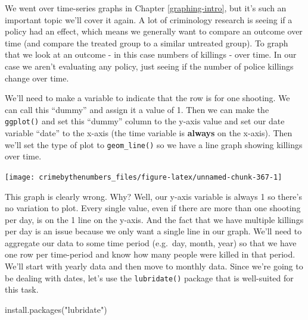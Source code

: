 \documentclass[
  a4paper,
]{krantz}
\makeatletter
\newenvironment{Shaded}{\begin{snugshade}}{\end{snugshade}}
\newcommand{\AttributeTok}[1]{\textcolor[rgb]{0.61,0.61,0.61}{#1}}
\newcommand{\DecValTok}[1]{\textcolor[rgb]{0.06,0.06,0.06}{#1}}
\newcommand{\FunctionTok}[1]{\textcolor[rgb]{0,0,0}{#1}}
\newcommand{\NormalTok}[1]{#1}
\newcommand{\OtherTok}[1]{\textcolor[rgb]{0.37,0.37,0.37}{#1}}
\newcommand{\SpecialCharTok}[1]{\textcolor[rgb]{0,0,0}{#1}}
\newcommand{\StringTok}[1]{\textcolor[rgb]{0.5,0.5,0.5}{#1}}
\newenvironment{kframe}{%
\medskip{}
\setlength{\fboxsep}{.8em}
 \def\at@end@of@kframe{}%
 \ifinner\ifhmode%
  \def\at@end@of@kframe{\end{minipage}}%
  \begin{minipage}{\columnwidth}%
 \fi\fi%
 \def\FrameCommand##1{\hskip\@totalleftmargin \hskip-\fboxsep
 \colorbox{shadecolor}{##1}\hskip-\fboxsep
     \hskip-\linewidth \hskip-\@totalleftmargin \hskip\columnwidth}%
 \MakeFramed {\advance\hsize-\width
   \@totalleftmargin\z@ \linewidth\hsize
   \@setminipage}}%
 {\par\unskip\endMakeFramed%
 \at@end@of@kframe}
\renewenvironment{Shaded}{\begin{kframe}}{\end{kframe}}
\makeatother
\begin{document}
We went over time-series graphs in Chapter
\ref{graphing-intro}, but it's such an important topic we'll
cover it again. A lot of criminology research is seeing if a
policy had an effect, which means we generally want to
compare an outcome over time (and compare the treated group
to a similar untreated group). To graph that we look at an
outcome - in this case numbers of killings - over time. In
our case we aren't evaluating any policy, just seeing if the
number of police killings change over time.

We'll need to make a variable to indicate that the row is
for one shooting. We can call this ``dummy'' and assign it a
value of 1. Then we can make the \texttt{ggplot()} and set
this ``dummy'' column to the y-axis value and set our date
variable ``date'' to the x-axis (the time variable is
\textbf{always} on the x-axis). Then we'll set the type of
plot to \texttt{geom\_line()} so we have a line graph
showing killings over time.

\begin{Shaded}
\end{Shaded}

\begin{center}\texttt{[image: crimebythenumbers\_files/figure-latex/unnamed-chunk-367-1]} \end{center}

This graph is clearly wrong. Why? Well, our y-axis variable
is always 1 so there's no variation to plot. Every single
value, even if there are more than one shooting per day, is
on the 1 line on the y-axis. And the fact that we have
multiple killings per day is an issue because we only want a
single line in our graph. We'll need to aggregate our data
to some time period (e.g.~day, month, year) so that we have
one row per time-period and know how many people were killed
in that period. We'll start with yearly data and then move
to monthly data. Since we're going to be dealing with dates,
let's use the \texttt{lubridate()} package that is
well-suited for this task.

\begin{Shaded}
\begin{Highlighting}[]
\FunctionTok{install.packages}\NormalTok{(}\StringTok{"lubridate"}\NormalTok{)}
\end{Highlighting}
\end{Shaded}
\end{document}
